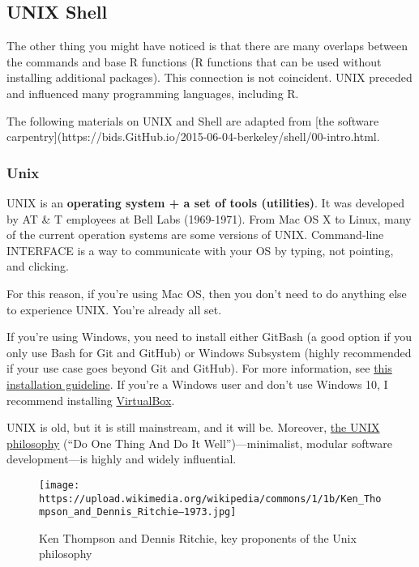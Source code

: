 \documentclass[
  letterpaper,
  DIV=11,
  numbers=noendperiod]{scrreprt}
\begin{document}
\hypertarget{unix-shell}{%
\subsection*{UNIX Shell}\label{unix-shell}}

The other thing you might have noticed is that there are many overlaps
between the commands and base R functions (R functions that can be used
without installing additional packages). This connection is not
coincident. UNIX preceded and influenced many programming languages,
including R.

The following materials on UNIX and Shell are adapted from {[}the
software
carpentry{]}(https://bids.GitHub.io/2015-06-04-berkeley/shell/00-intro.html.

\hypertarget{unix}{%
\subsubsection*{Unix}\label{unix}}

UNIX is an \textbf{operating system + a set of tools (utilities)}. It
was developed by AT \& T employees at Bell Labs (1969-1971). From Mac OS
X to Linux, many of the current operation systems are some versions of
UNIX. Command-line INTERFACE is a way to communicate with your OS by
typing, not pointing, and clicking.

For this reason, if you're using Mac OS, then you don't need to do
anything else to experience UNIX. You're already all set.

If you're using Windows, you need to install either GitBash (a good
option if you only use Bash for Git and GitHub) or Windows Subsystem
(highly recommended if your use case goes beyond Git and GitHub). For
more information, see
\href{https://github.com/cjbarrie/CS-ED/blob/main/other/setup.md}{this
installation guideline}. If you're a Windows user and don't use Windows
10, I recommend installing
\href{https://www.virtualbox.org/}{VirtualBox}.

UNIX is old, but it is still mainstream, and it will be. Moreover,
\href{https://en.wikipedia.org/wiki/Unix_philosophy}{the UNIX
philosophy} (``Do One Thing And Do It Well'')---minimalist, modular
software development---is highly and widely influential.

\begin{figure}

{\centering \texttt{[image: https://upload.wikimedia.org/wikipedia/commons/1/1b/Ken\_Thompson\_and\_Dennis\_Ritchie--1973.jpg]}

}

\caption{Ken Thompson and Dennis Ritchie, key proponents of the Unix
philosophy}

\end{figure}
\end{document}
